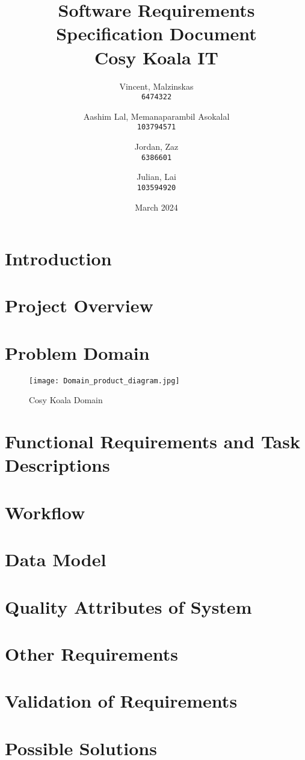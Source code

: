 \documentclass{article}
\title{Software Requirements Specification
Document\\
Cosy Koala IT}
\author{
  Vincent, Malzinskas\\
  \texttt{6474322}
  \and
  Aashim Lal, Memanaparambil Asokalal\\
  \texttt{103794571}
  \and
  Jordan, Zaz\\
  \texttt{6386601}
  \and
  Julian, Lai\\
  \texttt{103594920}
}
\date{March 2024}
\begin{document}
\maketitle

\section{Introduction}
\section{Project Overview}
\clearpage
\section{Problem Domain}
\begin{figure}[!h]
    \centering
    \texttt{[image: Domain\_product\_diagram.jpg]}
    \caption{Cosy Koala Domain}
    \label{fig:Domain_Product}
\end{figure}



\section{Functional Requirements and Task Descriptions}
\section{Workflow}
\section{Data Model}
\section{Quality Attributes of System}
\section{Other Requirements}
\section{Validation of Requirements}
\section{Possible Solutions}
\end{document}
